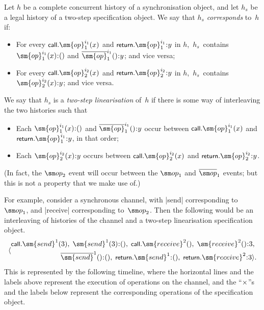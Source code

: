 Let $h$ be a complete concurrent history of a synchronisation object, and let
$h_s$ be a legal history of a two-step specification object.  We say that
$h_s$ \emph{corresponds} to~$h$ if:
%
\begin{itemize}
\item For every $\call.\sm{op}_1^{i_1}(x)$ and $\return.\sm{op}_1^{i_1}\::y$
  in $h$,\, $h_s$~contains $\sm{op}_1^{i_1}(x)\::()$ and
  $\overline{\sm{op}}_1^{i_1}()\::y$; and vice versa;

\item For every $\call.\sm{op}_2^{i_2}(x)$ and $\return.\sm{op}_2^{i_2}\::y$
  in $h$,\, $h_s$~contains $\sm{op}_2^{i_2}(x)\::y$; and vice versa.
\end{itemize}
%
We say that $h_s$ is a \emph{two-step linearisation} of~$h$ if there is some
way of interleaving the two histories such that
%
\begin{itemize}
\item Each $\sm{op}_1^{i_1}(x)\::()$ and $\overline{\sm{op}}_1^{i_1}()\::y$ occur
  between $\call.\sm{op}_1^{i_1}(x)$ and $\return.\sm{op}_1^{i_1}\::y$, in that
  order; 

\item Each $\sm{op}_2^{i_2}(x)\::y$ occurs between $\call.\sm{op}_2^{i_2}(x)$ and
  $\return.\sm{op}_2^{i_2}\::y$.
\end{itemize}
%
(In fact, the $\op_2$ event will occur between the $\op_1$ and
$\overline\op_1$ events; but this is not a property that we make use of.)

For example, consider a synchronous channel, with |send| corresponding
to~$\op_1$, and |receive| corresponding to~$\op_2$.  Then the following would
be an interleaving of histories of the channel and a two-step linearisation
specification object.
\[
\seq{\begin{align} 
 \call.\sm{send}^1(3),\; \sm{send}^1(3)\::(),\; 
 \call.\sm{receive}^2(),\; \sm{receive}^2()\::3,\; \\
 \overline{\sm{send}}^1()\::(),\; \return.\sm{send}^1\::(), \;
 \return.\sm{receive}^2\::3 }.
\end{align}
\]
%
This is represented by the following timeline, where the horizontal lines and
the labels above represent the execution of operations on the channel, and the
``$\times$''s and the labels below represent the corresponding operations of
the specification object.
%  
\begin{center}
\end{center}

